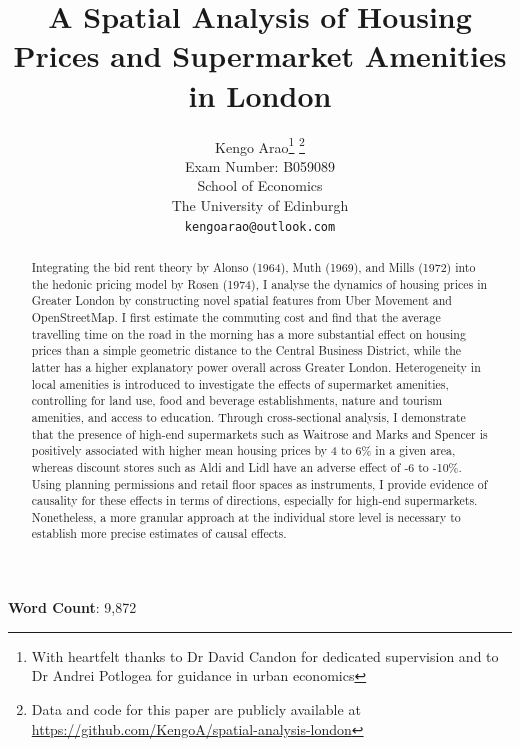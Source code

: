 \documentclass{article}
\title{A Spatial Analysis of Housing Prices and Supermarket Amenities in London}
\author{
  \large{Kengo Arao}\thanks{With heartfelt thanks to Dr David Candon for dedicated supervision and to Dr Andrei Potlogea for guidance in urban economics}      \thanks{Data and code for this paper are publicly available at \href{https://github.com/KengoA/spatial-analysis-london}{https://github.com/KengoA/spatial-analysis-london}} \\
  Exam Number: B059089 \\
  School of Economics\\
  The University of Edinburgh\\
  \texttt{kengoarao@outlook.com}
}
\begin{document}
\maketitle

\begin{abstract}
Integrating the bid rent theory by Alonso (1964), Muth (1969), and Mills (1972) into the hedonic pricing model by Rosen (1974), I analyse the dynamics of housing prices in Greater London by constructing novel spatial features from Uber Movement and OpenStreetMap. I first estimate the commuting cost and find that the average travelling time on the road in the morning has a more substantial effect on housing prices than a simple geometric distance to the Central Business District, while the latter has a higher explanatory power overall across Greater London. Heterogeneity in local amenities is introduced to investigate the effects of supermarket amenities, controlling for land use, food and beverage establishments, nature and tourism amenities, and access to education. Through cross-sectional analysis, I demonstrate that the presence of high-end supermarkets such as Waitrose and Marks and Spencer is positively associated with higher mean housing prices by 4 to 6\% in a given area, whereas discount stores such as Aldi and Lidl have an adverse effect of -6 to -10\%. Using planning permissions and retail floor spaces as instruments, I provide evidence of causality for these effects in terms of directions, especially for high-end supermarkets. Nonetheless, a more granular approach at the individual store level is necessary to establish more precise estimates of causal effects.

\end{abstract}

\begin{center}
    \textbf{Word Count}: 9,872
\end{center}

\newpage
\tableofcontents


\newpage
\end{document}
